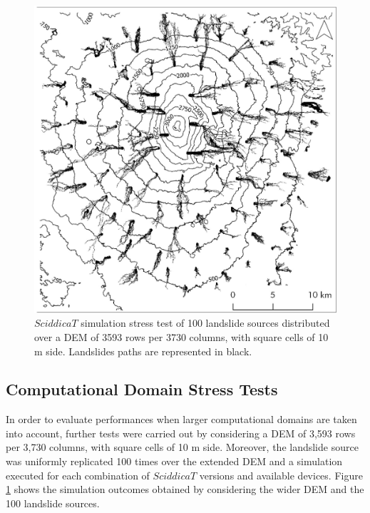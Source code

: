 \begin{figure}
	\begin{center}
		\includegraphics[width=1.0\textwidth]{./images/opencal/Figure11_new}
		\caption{$SciddicaT$ simulation stress test of 100 landslide
			sources distributed over a DEM of 3593 rows per 3730
			columns, with square cells of 10 m side. Landslides paths
			are represented in black.}
		\label{fig:stresstestR}
	\end{center}
\end{figure}

\subsection{Computational Domain Stress Tests}
\label{sec:opencal_stress_testR}
In order to evaluate performances when larger computational
domains are taken into account, further tests were carried out by
considering a DEM of 3,593 rows per 3,730 columns, with square
cells of 10 m side. Moreover, the landslide source was uniformly
replicated 100 times over the extended DEM and a simulation
executed for each combination of $SciddicaT$ versions and
available devices. Figure \ref{fig:stresstestR} shows the
simulation outcomes obtained by considering the wider DEM and the
100 landslide sources.

